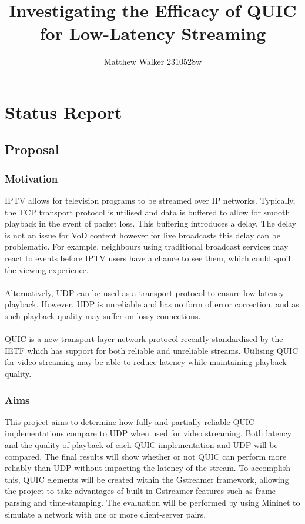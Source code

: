 \documentclass[11pt]{article}
\title{Investigating the Efficacy of QUIC for Low-Latency Streaming}
\author{Matthew Walker 2310528w}
\begin{document}
    \maketitle
    
    
     

\section{Status Report}

\subsection{Proposal}\label{proposal}

\subsubsection{Motivation}\label{motivation}

IPTV allows for television programs to be streamed over IP networks. Typically, 
the TCP transport protocol is utilised and data is buffered to allow for smooth
playback in the event of packet loss. This buffering introduces a delay. The delay
is not an issue for VoD content however for live broadcasts this delay can be problematic.
For example, neighbours using traditional broadcast services may react to events before
IPTV users have a chance to see them, which could spoil the viewing experience. 
\\\\
Alternatively, UDP can be used as a transport protocol to ensure low-latency playback. 
However, UDP is unreliable and has no form of error correction, and as such playback
quality may suffer on lossy connections.
\\\\
QUIC is a new transport layer network protocol recently standardised by the IETF which 
has support for both reliable and unreliable streams. Utilising QUIC for video streaming
may be able to reduce latency while maintaining playback quality.

\subsubsection{Aims}\label{aims}

This project aims to determine how fully and partially reliable QUIC implementations compare to UDP when used for video streaming.
Both latency and the quality of playback of each QUIC implementation and UDP will be compared. The final results will show whether or not 
QUIC can perform more reliably than UDP without impacting the latency of the stream. To accomplish this, QUIC elements will be created within the Gstreamer framework,
allowing the project to take advantages of built-in Gstreamer features such as frame parsing and time-stamping. The evaluation will be performed
by using Mininet to simulate a network with one or more client-server pairs.
\end{document}
